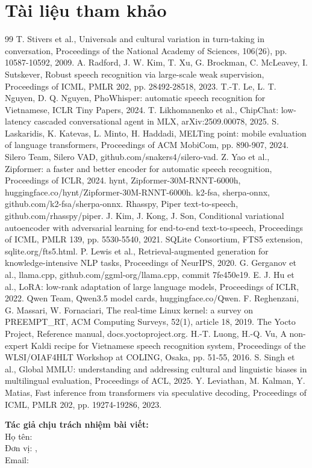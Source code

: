 \documentclass[a4paper,12pt,twocolumn]{article}
\begin{document}
\section{Tài liệu tham khảo}
\vspace{-20pt}
{\footnotesize\setlength{\parskip}{0pt}\raggedright
\begin{thebibliography}{99}\setlength{\itemsep}{1pt}
 T. Stivers et al., Universals and cultural variation in turn-taking in conversation, Proceedings of the National Academy of Sciences, 106(26), pp. 10587-10592, 2009.
 A. Radford, J. W. Kim, T. Xu, G. Brockman, C. McLeavey, I. Sutskever, Robust speech recognition via large-scale weak supervision, Proceedings of ICML, PMLR 202, pp. 28492-28518, 2023.
 T.-T. Le, L. T. Nguyen, D. Q. Nguyen, PhoWhisper: automatic speech recognition for Vietnamese, ICLR Tiny Papers, 2024.
 T. Likhomanenko et al., ChipChat: low-latency cascaded conversational agent in MLX, arXiv:2509.00078, 2025.
 S. Laskaridis, K. Katevas, L. Minto, H. Haddadi, MELTing point: mobile evaluation of language transformers, Proceedings of ACM MobiCom, pp. 890-907, 2024.
 Silero Team, Silero VAD, github.com/snakers4/silero-vad.
 Z. Yao et al., Zipformer: a faster and better encoder for automatic speech recognition, Proceedings of ICLR, 2024.
 hynt, Zipformer-30M-RNNT-6000h, huggingface.co/hynt/Zipformer-30M-RNNT-6000h.
 k2-fsa, sherpa-onnx, github.com/k2-fsa/sherpa-onnx.
 Rhasspy, Piper text-to-speech, github.com/rhasspy/piper.
 J. Kim, J. Kong, J. Son, Conditional variational autoencoder with adversarial learning for end-to-end text-to-speech, Proceedings of ICML, PMLR 139, pp. 5530-5540, 2021.
 SQLite Consortium, FTS5 extension, sqlite.org/fts5.html.
 P. Lewis et al., Retrieval-augmented generation for knowledge-intensive NLP tasks, Proceedings of NeurIPS, 2020.
 G. Gerganov et al., llama.cpp, github.com/ggml-org/llama.cpp, commit 7fe450e19.
 E. J. Hu et al., LoRA: low-rank adaptation of large language models, Proceedings of ICLR, 2022.
 Qwen Team, Qwen3.5 model cards, huggingface.co/Qwen.
 F. Reghenzani, G. Massari, W. Fornaciari, The real-time Linux kernel: a survey on PREEMPT\_RT, ACM Computing Surveys, 52(1), article 18, 2019.
 The Yocto Project, Reference manual, docs.yoctoproject.org.
 H.-T. Luong, H.-Q. Vu, A non-expert Kaldi recipe for Vietnamese speech recognition system, Proceedings of the WLSI/OIAF4HLT Workshop at COLING, Osaka, pp. 51-55, 2016.
 S. Singh et al., Global MMLU: understanding and addressing cultural and linguistic biases in multilingual evaluation, Proceedings of ACL, 2025.
 Y. Leviathan, M. Kalman, Y. Matias, Fast inference from transformers via speculative decoding, Proceedings of ICML, PMLR 202, pp. 19274-19286, 2023.
\end{thebibliography}}

\vspace{4pt}
\noindent\begin{minipage}{\columnwidth}\setlength{\parskip}{0pt}
\textbf{Tác giả chịu trách nhiệm bài viết:}\\
Họ tên: \svmot\\
Đơn vị: \khoa, \truong\\
Email: \emailmot
\end{minipage}
\end{document}
